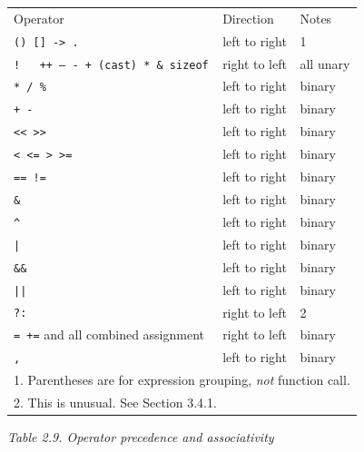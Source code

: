    \begin{tabular}{llp{\textwidth}}
     Operator & Direction & Notes
    \\

     \texttt{() [] -> .} & left to right & 1
    \\

     \texttt{! ~ ++ -- - + (cast) * \& sizeof} & right to left & all unary
    \\

     \texttt{* / \%} & left to right & binary
    \\

     \texttt{+ -} & left to right & binary
    \\

     \texttt{<< >>} & left to right & binary
    \\

     \texttt{< <= > >=} & left to right & binary
    \\

     \texttt{== !=} & left to right & binary
    \\

     \texttt{\&} & left to right & binary
    \\

     \texttt{\^} & left to right & binary
    \\

     \texttt{|} & left to right & binary
    \\

     \texttt{\&\&} & left to right & binary
    \\

     \texttt{||} & left to right & binary
    \\

     \texttt{?:} & right to left & 2
    \\

     \texttt{= +=} and all combined assignment & right to left & binary
    \\

     \texttt{,} & left to right & binary
    \\
\multicolumn{3}{p{0.9\textwidth}}{1. Parentheses are for expression grouping, \textit{not}
     function call.}\\
\multicolumn{3}{p{0.9\textwidth}}{2. This is unusual. See Section 3.4.1.}\\
\end{tabular}

\begin{center}\textit{Table 2.9. Operator precedence and associativity}\end{center}


